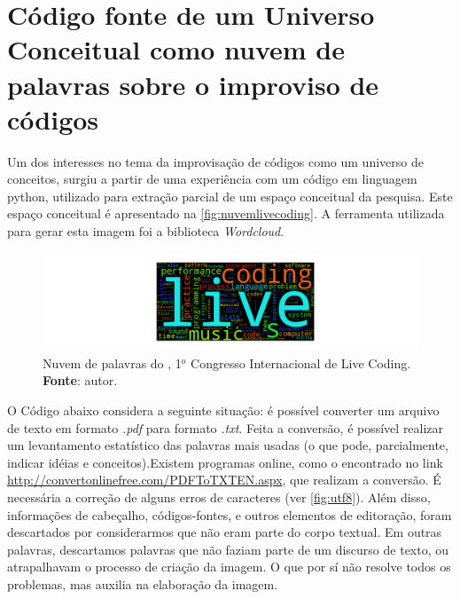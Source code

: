 \chapter{Código fonte de um Universo Conceitual como nuvem de palavras sobre o improviso de códigos}\label{app:A}

Um dos interesses no tema da improvisação de códigos como um universo de conceitos, surgiu a partir de uma experiência com um código em linguagem python, utilizado para extração parcial de um espaço conceitual da pesquisa. Este espaço conceitual é apresentado na \autoref{fig:nuvemlivecoding}. A ferramenta utilizada para gerar esta imagem foi a biblioteca \emph{Wordcloud}.

\begin{figure}[!h]
\includegraphics[scale=0.8]{imagens/nuvem.png}
\caption{Nuvem de palavras do ,  1$^o$ Congresso Internacional de Live Coding. \textbf{Fonte}: autor.}
\label{fig:nuvemlivecoding}
\end{figure}

O Código abaixo considera a seguinte situação: é possível converter um arquivo de texto em formato \emph{.pdf} para formato \emph{.txt}. Feita a conversão, é possível realizar um levantamento estatístico das palavras mais usadas (o que pode, parcialmente, indicar idéias e conceitos).Existem programas online, como o encontrado no link \url{http://convertonlinefree.com/PDFToTXTEN.aspx}, que realizam a conversão. É necessária a correção de alguns erros de caracteres (ver \autoref{fig:utf8}). Além disso, informações de cabeçalho, códigos-fontes, e outros elementos de editoração, foram descartados por considerarmos que não eram parte do corpo textual. Em outras palavras, descartamos palavras que não faziam parte de um discurso de texto, ou atrapalhavam o processo de criação da imagem. O que por sí não resolve todos os problemas, mas auxilia na elaboração da imagem.

